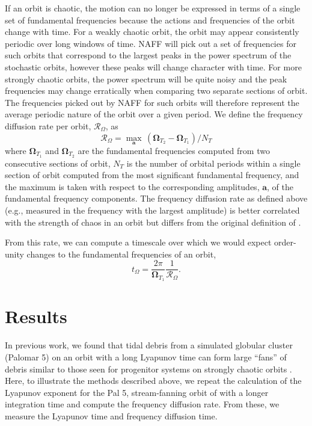 \documentclass[letterpaper,12pt,preprint]{aastex}
\newcommand{\bs}[1]{\boldsymbol{#1}}
\newcommand{\fdrate}{\mathcal{R}_\Omega}
\begin{document}
If an orbit is chaotic, the motion can no longer be expressed in terms of a single set of fundamental frequencies because the actions and frequencies of the orbit change with time. For a weakly chaotic orbit, the orbit may appear consistently periodic over long windows of time. NAFF will pick out a set of frequencies for such orbits that correspond to the largest peaks in the power spectrum of the stochastic orbits, however these peaks will change character with time. For more strongly chaotic orbits, the power spectrum will be quite noisy and the peak frequencies may change erratically when comparing two separate sections of orbit. The frequencies picked out by NAFF for such orbits will therefore represent the average periodic nature of the orbit over a given period. We define the frequency diffusion rate per orbit, $\fdrate$, as
\begin{equation}
	\fdrate = \max_{\bs{a}} \, (\bs{\Omega}_{T_2} - \bs{\Omega}_{T_1}) / N_T \label{eq:fdrate}
\end{equation}
where $\bs{\Omega}_{T_1}$ and $\bs{\Omega}_{T_2}$ are the fundamental frequencies computed from two consecutive sections of orbit, $N_T$ is the number of orbital periods within a single section of orbit computed from the most significant fundamental frequency, and the maximum is taken with respect to the corresponding amplitudes, $\bs{a}$, of the fundamental frequency components. The frequency diffusion rate as defined above (e.g., measured in the frequency with the largest amplitude) is better correlated with the strength of chaos in an orbit \citep{valluri??} but differs from the original definition of \cite{valluri98}.

From this rate, we can compute a timescale over which we would expect order-unity changes to the fundamental frequencies of an orbit,
\begin{equation}
	t_\Omega = \frac{2 \pi}{\bs{\Omega}_{T_1}} \frac{1}{\fdrate}.
\end{equation}

%
\section{Results}

In previous work, we found that tidal debris from a simulated globular cluster (Palomar 5) on an orbit with a long Lyapunov time can form large ``fans'' of debris similar to those seen for progenitor systems on strongly chaotic orbits \citep{pearson15, fardal14}. Here, to illustrate the methods described above, we repeat the calculation of the Lyapunov exponent for the Pal 5, stream-fanning orbit of \cite{pearson15} with a longer integration time and compute the frequency diffusion rate. From these, we measure the Lyapunov time and frequency diffusion time. 
\end{document}
